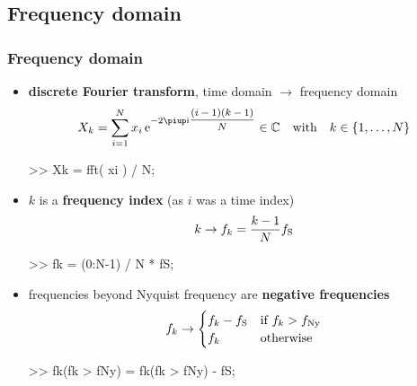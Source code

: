 
\subsection{Frequency domain}

\begin{frame}[fragile] %
	\frametitle{Frequency domain}
	\begin{itemize}
		\item \textbf{discrete Fourier transform}, time domain $\rightarrow$ frequency domain
			\begin{align*}
				X_k=\sum_{i=1}^Nx_i\,\ee^{-2\pi\ii\mfrac{(i-1)(k-1)}N}\in\mathbb C\quad\textrm{with}\quad k\in\{1,\ldots,N\}
			\end{align*}
			\begin{code}
>> Xk = fft( xi ) / N; \color{medium}%
			\end{code}
		\item $k$ is a \textbf{frequency index} (as $i$ was a time index)
			\begin{align*}
				k\rightarrow f_k=\frac{k-1}Nf_{\textrm S}
			\end{align*}
			\begin{code}
>> fk = (0:N-1) / N * fS; \color{medium}%
			\end{code}
		\item frequencies beyond Nyquist frequency are \textbf{negative frequencies}
			\begin{align*}
				f_k\rightarrow\begin{cases}f_k-f_{\textrm S}&\textrm{if $f_k>f_{\textrm{Ny}}$}\\f_k&\textrm{otherwise}\end{cases}
			\end{align*}
			\begin{code}
>> fk(fk > fNy) = fk(fk > fNy) - fS; \color{medium}%
			\end{code}
	\end{itemize}
\end{frame}

